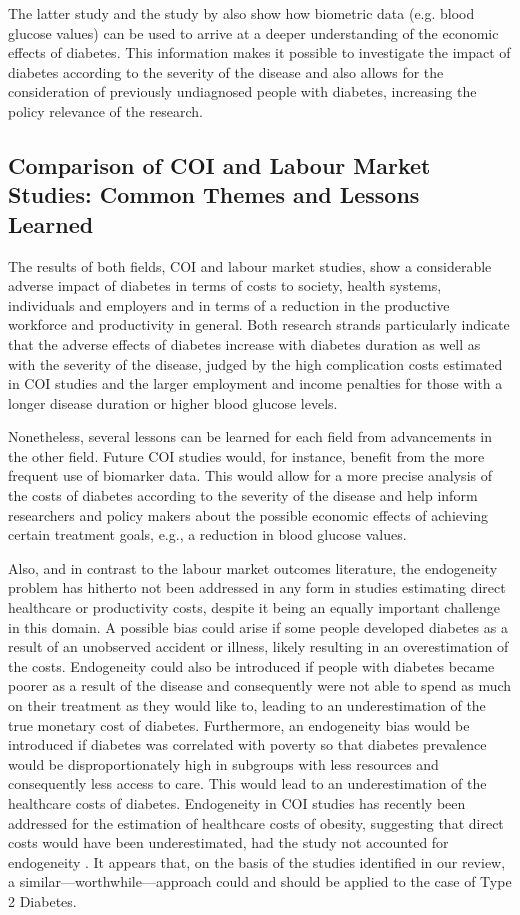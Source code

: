 \documentclass[12pt,english]{article}
\begin{document}
The latter study and the study by \textcite{Liu2014} also show how biometric data (e.g. blood glucose values) can be used to arrive at a deeper understanding of the economic effects of diabetes. This information makes it possible to investigate the impact of diabetes according to the severity of the disease and also allows for the consideration of previously undiagnosed people with diabetes, increasing the policy relevance of the research.

\subsection{Comparison of \ac{COI} and Labour Market Studies: Common Themes and Lessons Learned}
The results of both fields, \ac{COI} and labour market studies, show a considerable adverse impact of diabetes in terms of costs to society, health systems, individuals and employers and in terms of a reduction in the productive workforce and productivity in general. Both research strands particularly indicate that the adverse effects of diabetes increase with diabetes duration as well as with the severity of the disease, judged by the high complication costs estimated in \ac{COI} studies and the larger employment and income penalties for those with a longer disease duration or higher blood glucose levels. 

Nonetheless, several lessons can be learned for each field from advancements in the other field. Future \ac{COI} studies would, for instance, benefit from the more frequent use of biomarker data. This would allow for a more precise analysis of the costs of diabetes according to the severity of the disease and help inform researchers and policy makers about the possible economic effects of achieving certain treatment goals, e.g., a reduction in blood glucose values.

Also, and in contrast to the labour market outcomes literature, the endogeneity problem has hitherto not been addressed in any form in studies estimating direct healthcare or productivity costs, despite it being an equally important challenge in this domain. A possible bias could arise if some people developed diabetes as a result of an unobserved accident or illness, likely resulting in an overestimation of the costs. Endogeneity could also be introduced if people with diabetes became poorer as a result of the disease and consequently were not able to spend as much on their treatment as they would like to, leading to an underestimation of the true monetary cost of diabetes. Furthermore, an endogeneity bias would be introduced if diabetes was correlated with poverty so that diabetes prevalence would be disproportionately high in subgroups with less resources and consequently less access to care. This would lead to an underestimation of the healthcare costs of diabetes. Endogeneity in \ac{COI} studies has recently been addressed for the estimation of healthcare costs of obesity, suggesting that direct costs would have been underestimated, had the study not accounted for endogeneity \parencite{Cawley2012b}. It appears that, on the basis of the studies identified in our review, a similar---worthwhile---approach could and should be applied to the case of Type 2 Diabetes.
\end{document}
